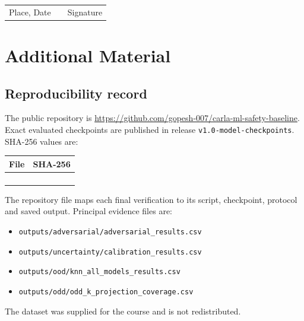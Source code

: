 \documentclass[nologo,a4paper,12pt]{article}
\begin{document}
\vspace{2.0cm}
\begin{tabularx}{\linewidth}{@{}X c X@{}}
  \cline{1-1} \cline{3-3}
  \multicolumn{1}{l}{\small Place, Date} & & \multicolumn{1}{l}{\small Signature}
\end{tabularx}

\clearpage
\appendix
\section{Additional Material}

\subsection{Reproducibility record}
\label{app:reproducibility}

The public repository is
\url{https://github.com/gopesh-007/carla-ml-safety-baseline}. Exact evaluated checkpoints are
published in release \texttt{v1.0-model-checkpoints}. SHA-256 values are:

{\footnotesize
\begin{tabularx}{\linewidth}{@{}p{4.4cm}Y@{}}
\toprule
File & SHA-256 \\
\midrule
{} & \texttt{} \\
 & \texttt{} \\
 & \texttt{} \\
 & \texttt{} \\
\bottomrule
\end{tabularx}}

The repository file  maps each final verification to its script, checkpoint,
protocol and saved output. Principal evidence files are:
{\footnotesize
\begin{itemize}
  \item \nolinkurl{outputs/adversarial/adversarial_results.csv}
  \item \nolinkurl{outputs/uncertainty/calibration_results.csv}
  \item \nolinkurl{outputs/ood/knn_all_models_results.csv}
  \item \nolinkurl{outputs/odd/odd_k_projection_coverage.csv}
\end{itemize}}
The dataset was supplied for the course and is not redistributed.
\end{document}

